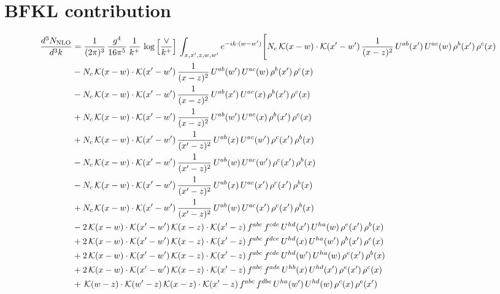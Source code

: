 \documentclass[9pt]{article}
\numberwithin{equation}{section}
\begin{document}
\section{BFKL contribution}
\begin{align}
    \frac{d^{3}N_{\mathrm{NLO}}}{d^{3}k} & = \frac{1}{(2\pi)^{3}}\,\frac{g^{4}}{16\pi^{5}}\,\frac{1}{k^{+}}\,\log\Big[\frac{\vee}{k^{+}}\Big]\,\int_{x,x',z,w,w'}e^{-ik\cdot (w-w')}\Bigg[N_{c}\,\mathcal{K}(x-w)\cdot\mathcal{K}(x'-w')\,\frac{1}{(x-z)^{2}}\,U^{ab}(x')\,U^{ac}(w)\,\rho^{b}(x')\,\rho^{c}(x)\notag\\
&-N_{c}\,\mathcal{K}(x-w)\cdot\mathcal{K}(x'-w')\,\frac{1}{(x-z)^{2}}\,U^{ab}(w')\,U^{ac}(w)\,\rho^{b}(x')\,\rho^{c}(x)\notag\\
&-N_{c}\,\mathcal{K}(x-w)\cdot\mathcal{K}(x'-w')\,\frac{1}{(x-z)^{2}}\,U^{ab}(x')\,U^{ac}(x)\,\rho^{b}(x')\,\rho^{c}(x)\notag\\
&+N_{c}\,\mathcal{K}(x-w)\cdot\mathcal{K}(x'-w')\,\frac{1}{(x-z)^{2}}\,U^{ab}(w')\,U^{ac}(x)\,\rho^{b}(x')\,\rho^{c}(x)\notag\\
&+N_{c}\,\mathcal{K}(x-w)\cdot\mathcal{K}(x'-w')\,\frac{1}{(x'-z)^{2}}\,U^{ab}(x)\,U^{ac}(w')\,\rho^{c}(x')\,\rho^{b}(x)\notag\\
&-N_{c}\,\mathcal{K}(x-w)\cdot\mathcal{K}(x'-w')\,\frac{1}{(x'-z)^{2}}\,U^{ab}(w)\,U^{ac}(w')\,\rho^{c}(x')\,\rho^{b}(x)\notag\\
&-N_{c}\,\mathcal{K}(x-w)\cdot\mathcal{K}(x'-w')\,\frac{1}{(x'-z)^{2}}\,U^{ab}(x)\,U^{ac}(x')\,\rho^{c}(x')\,\rho^{b}(x)\notag\\
&+N_{c}\,\mathcal{K}(x-w)\cdot\mathcal{K}(x'-w')\,\frac{1}{(x'-z)^{2}}\,U^{ab}(w)\,U^{ac}(x')\,\rho^{c}(x')\,\rho^{b}(x)\notag\\
&-2\,\mathcal{K}(x-w)\cdot\mathcal{K}(x'-w')\,\mathcal{K}(x-z)\cdot\mathcal{K}(x'-z)\,f^{abc}\,f^{cde}\,U^{hd}(x')\,U^{ha}(w)\,\rho^{e}(x')\,\rho^{b}(x)\notag\\
&+2\,\mathcal{K}(x-w)\cdot\mathcal{K}(x'-w')\,\mathcal{K}(x-z)\cdot\mathcal{K}(x'-z)\,f^{abc}\,f^{dce}\,U^{hd}(x)\,U^{ha}(w')\,\rho^{b}(x')\,\rho^{e}(x)\notag\\
&+2\,\mathcal{K}(x-w)\cdot\mathcal{K}(x'-w')\,\mathcal{K}(x-z)\cdot\mathcal{K}(x'-z)\,f^{abc}\,f^{cde}\,U^{hd}(w')\,U^{ha}(w)\,\rho^{e}(x')\,\rho^{b}(x)\notag\\
&+2\,\mathcal{K}(x-w)\cdot\mathcal{K}(x'-w')\,\mathcal{K}(x-z)\cdot\mathcal{K}(x'-z)\,f^{abc}\,f^{ade}\,U^{hb}(x)\,U^{hd}(x')\,\rho^{e}(x')\,\rho^{c}(x)\notag\\
&+\,\mathcal{K}(w-z)\cdot\mathcal{K}(w'-z)\,\mathcal{K}(x-z)\cdot\mathcal{K}(x'-z)\,f^{abc}\,f^{dbe}\,U^{ha}(w')\,U^{hd}(w)\,\rho^{c}(x)\,\rho^{e}(x')\notag\\

\end{align}
\end{document}
